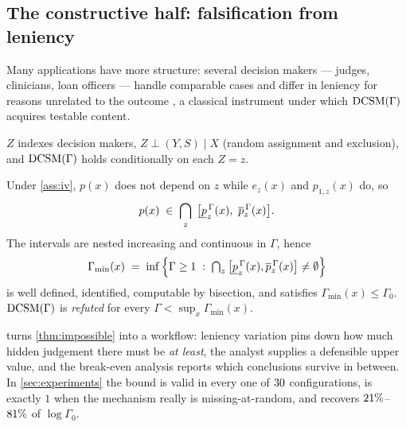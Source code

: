 \subsection{The constructive half: falsification from leniency}

Many applications have more structure: several decision makers --- judges,
clinicians, loan officers --- handle comparable cases and differ in leniency
for reasons unrelated to the outcome \citep{kleinberg2018human,
arnold2022measuring}, a classical instrument \citep{imbens1994identification}
under which $\textup{DCSM}(\Gamma)$ acquires testable content.

\begin{assumption}
\label{ass:iv}
$Z$ indexes decision makers, $Z \perp (Y,S)\mid X$ (random assignment and
exclusion), and $\textup{DCSM}(\Gamma)$ holds conditionally on each $Z=z$.
\end{assumption}

\begin{proposition}
\label{prop:falsify}
Under \cref{ass:iv}, $p(x)$ does not depend on $z$ while $e_z(x)$ and
$p_{1,z}(x)$ do, so
\[
  p(x) \;\in\; \bigcap_{z}\;\big[\plo^{\,\Gamma}_z(x),\ \pup^{\,\Gamma}_z(x)\big].
\]
The intervals are nested increasing and continuous in $\Gamma$, hence
\[
  \Gamma_{\min}(x)
  \;=\;
  \inf\Big\{\Gamma\ge1 \;:\; \textstyle\bigcap_z
  \big[\underline{p}^{\,\Gamma}_z(x),\overline{p}^{\,\Gamma}_z(x)\big] \neq \emptyset \Big\}
\]
is well defined, identified, computable by bisection, and satisfies
$\Gamma_{\min}(x)\le\Gamma_0$. $\textup{DCSM}(\Gamma)$ is \emph{refuted} for every
$\Gamma < \sup_x \Gamma_{\min}(x)$.
\end{proposition}

 turns \cref{thm:impossible} into a workflow: leniency
variation pins down how much hidden judgement there must be \emph{at least},
the analyst supplies a defensible upper value, and the break-even analysis
reports which conclusions survive in between. In \cref{sec:experiments} the
bound is valid in every one of $30$ configurations, is exactly $1$
when the mechanism really is missing-at-random, and recovers
$21\%$--$81\%$ of $\log\Gamma_0$.
